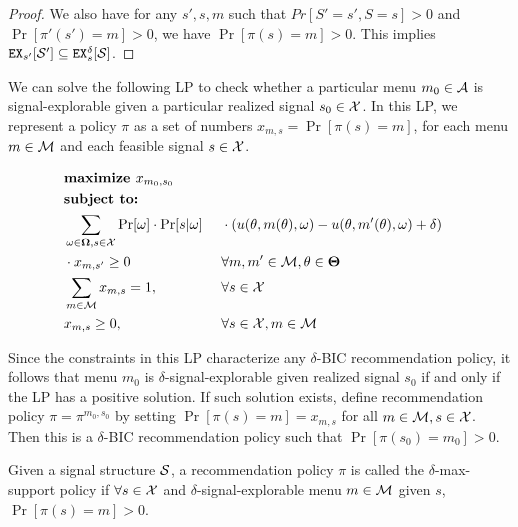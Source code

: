 \begin{proof}
We also have for any $s', s ,m$ such that $Pr[S' = s',S = s] >0 $ and $\Pr[\pi'(s') = m] >0$, we have $\Pr[\pi(s) = m] > 0$. This implies $\EX_{s'}[\S'] \subseteq \EX^{\delta}_s[\S]$.
\end{proof}


We can solve the following LP to check whether a particular menu $m_0 \in\A$ is signal-explorable given a particular realized signal $s_0\in\X$. In this LP, we represent a policy $\pi$ as a set of numbers
    $x_{m,s} = \Pr[\pi(s)=m]$,
for each menu $m\in \M$ and each feasible signal $s\in \X$.

\begin{figure}[H]
\begin{mdframed}
\begin{alignat*}{2}
 & \textbf{maximize }    x_{m_0,s_0}\  \\
&  \textbf{subject to: }\\
 & \sum_{\omega \in \varOmega, s \in \X} \Pr[\omega] \cdot \Pr[s | \omega] &  & \cdot \left(u(\theta, m(\theta), \omega) - u(\theta, m'(\theta), \omega) + \delta\right)\\
 & \cdot x_{m,s'} \geq 0  &\ & \forall m,m' \in \M, \theta \in \varTheta \\
                       & \sum_{m\in \M} x_{m,s} = 1,  \ &\ & \forall s \in \X \\
                       & x_{m,s} \geq 0,  \ &\ & \forall s \in \X, m\in \M \\
\end{alignat*}
\end{mdframed}
\label{fig:nocc_lp}
\end{figure}

Since the constraints in this LP characterize any $\delta$-BIC recommendation policy, it follows that menu $m_0$ is $\delta$-signal-explorable given realized signal $s_0$ if and only if the LP has a positive solution. If such solution exists, define recommendation policy $\pi = \pi^{m_0,s_0}$ by setting $\Pr[\pi(s) = m] = x_{m,s}$ for all $m \in \M, s \in \X$. Then this is a $\delta$-BIC recommendation policy such that $\Pr[\pi(s_0) = m_0] > 0$.

\begin{definition}
Given a signal structure $\S$, a recommendation policy $\pi$ is called the $\delta$-max-support policy if $\forall s \in \X$  and $\delta$-signal-explorable menu $m\in \M$ given $s$, $\Pr[\pi(s) = m] > 0$.
\end{definition}

